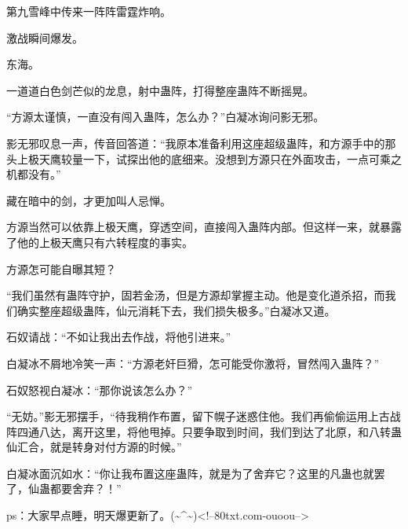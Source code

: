 \begin{this_body}
第九雪峰中传来一阵阵雷霆炸响。

激战瞬间爆发。

东海。

一道道白色剑芒似的龙息，射中蛊阵，打得整座蛊阵不断摇晃。

“方源太谨慎，一直没有闯入蛊阵，怎么办？”白凝冰询问影无邪。

影无邪叹息一声，传音回答道：“我原本准备利用这座超级蛊阵，和方源手中的那头上极天鹰较量一下，试探出他的底细来。没想到方源只在外面攻击，一点可乘之机都没有。”

藏在暗中的剑，才更加叫人忌惮。

方源当然可以依靠上极天鹰，穿透空间，直接闯入蛊阵内部。但这样一来，就暴露了他的上极天鹰只有六转程度的事实。

方源怎可能自曝其短？

“我们虽然有蛊阵守护，固若金汤，但是方源却掌握主动。他是变化道杀招，而我们确实整座超级蛊阵，仙元消耗下去，我们损失极多。”白凝冰又道。

石奴请战：“不如让我出去作战，将他引进来。”

白凝冰不屑地冷笑一声：“方源老奸巨猾，怎可能受你激将，冒然闯入蛊阵？”

石奴怒视白凝冰：“那你说该怎么办？”

“无妨。”影无邪摆手，“待我稍作布置，留下幌子迷惑住他。我们再偷偷运用上古战阵四通八达，离开这里，将他甩掉。只要争取到时间，我们到达了北原，和八转蛊仙汇合，就是转身对付方源的时候。”

白凝冰面沉如水：“你让我布置这座蛊阵，就是为了舍弃它？这里的凡蛊也就罢了，仙蛊都要舍弃？！”

ps：大家早点睡，明天爆更新了。(\~{}\^{}\~{})<!--80txt.com-ouoou-->

\end{this_body}

